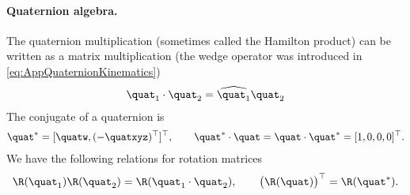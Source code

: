 \paragraph*{Quaternion algebra.}
The quaternion multiplication (sometimes called the Hamilton product) can be written as a matrix multiplication (the wedge operator was introduced in \eqref{eq:AppQuaternionKinematics})
\begin{align}
 \quat_1 \cdot \quat_2 = \widehat{\quat_1} \quat_2
\end{align}
The conjugate of a quaternion is
\begin{align}
 \quat^\ast = [\quatw, (-\quatxyz)^\top ]^\top, 
\qquad
 \quat^\ast \cdot \quat = \quat \cdot \quat^\ast = [1,0,0,0]^\top.
\end{align}
We have the following relations for rotation matrices
\begin{align}
 \R(\quat_1) \R(\quat_2) = \R(\quat_1 \cdot \quat_2),
\qquad
 \big( \R(\quat) \big)^\top = \R(\quat^\ast).
\end{align}

